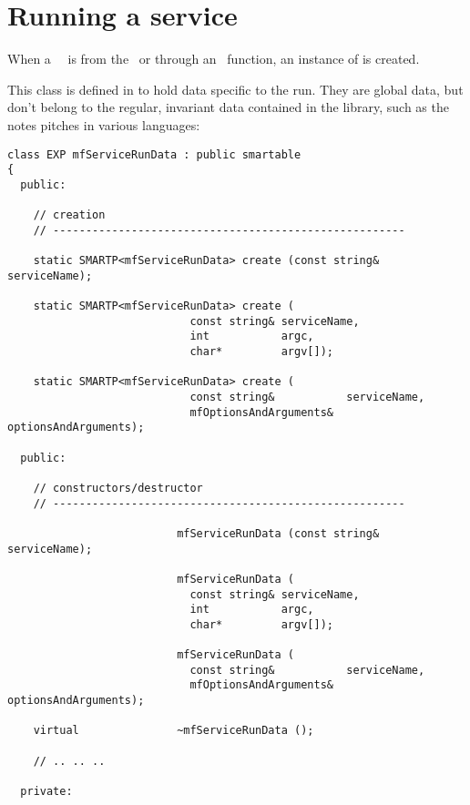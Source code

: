 \section{Running a service}

When a \mf\ \service\ is  from the \CLI\ or through an \API\ function, an instance of  is created.

This class is defined in  to hold data specific to the run. They are global data, but don't belong to the regular, invariant data contained in the library, such as the notes pitches in various languages: %
\begin{lstlisting}[language=CPlusPlus]
class EXP mfServiceRunData : public smartable
{
  public:

    // creation
    // ------------------------------------------------------

    static SMARTP<mfServiceRunData> create (const string& serviceName);

    static SMARTP<mfServiceRunData> create (
                            const string& serviceName,
                            int           argc,
                            char*         argv[]);

    static SMARTP<mfServiceRunData> create (
                            const string&           serviceName,
                            mfOptionsAndArguments& optionsAndArguments);

  public:

    // constructors/destructor
    // ------------------------------------------------------

                          mfServiceRunData (const string& serviceName);

                          mfServiceRunData (
                            const string& serviceName,
                            int           argc,
                            char*         argv[]);

                          mfServiceRunData (
                            const string&           serviceName,
                            mfOptionsAndArguments& optionsAndArguments);

    virtual               ~mfServiceRunData ();

	// .. .. ..

  private:


\end{lstlisting}
